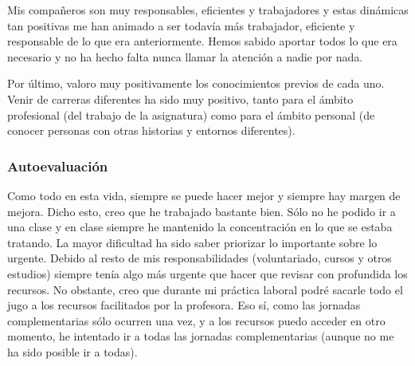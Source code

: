 \begin{leftbar}{\victorcolor}
Mis compañeros son muy responsables, eficientes y trabajadores y estas dinámicas tan positivas me han animado a ser todavía más trabajador, eficiente y responsable de lo que era anteriormente. 
%
Hemos sabido aportar todos lo que era necesario y no ha hecho falta nunca llamar la atención a nadie por nada.

Por último, valoro muy positivamente los conocimientos previos de cada uno. Venir de carreras diferentes ha sido muy positivo, tanto para el ámbito profesional (del trabajo de la asignatura) como para el ámbito personal (de conocer personas con otras historias y entornos diferentes).

\subsubsection{Autoevaluación}

Como todo en esta vida, siempre se puede hacer mejor y siempre hay margen de mejora. 
%
Dicho esto, creo que he trabajado bastante bien. 
%
Sólo no he podido ir a una clase y en clase siempre he mantenido la concentración en lo que se estaba tratando.
%
La mayor dificultad ha sido saber priorizar lo importante sobre lo urgente. 
%
Debido al resto de mis responsabilidades (voluntariado, cursos y otros estudios) siempre tenía algo más urgente que hacer que revisar con profundida los recursos.
%
No obstante, creo que durante mi práctica laboral podré sacarle todo el jugo a los recursos facilitados por la profesora.
%
Eso sí, como las jornadas complementarias sólo ocurren una vez, y a los recursos puedo acceder en otro momento, he intentado ir a todas las jornadas complementarias (aunque no me ha sido posible ir a todas).

\end{leftbar}

